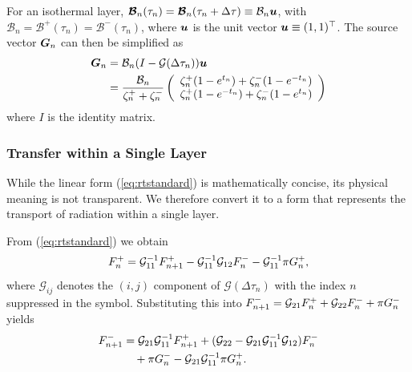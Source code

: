 For an isothermal layer, $\boldsymbol{\mathcal{B}}_n (\tau_n) = \boldsymbol{\mathcal{B}}_n (\tau_n + \Delta \tau) \equiv \mathcal{B}_n \boldsymbol{u}$, with $\mathcal{B}_n = \mathcal{B}^+ (\tau_n) = \mathcal{B}^- (\tau_n)$, where $\boldsymbol{u}$ is the unit vector $\boldsymbol{u} \equiv (1,1)^\top$. The source vector $\boldsymbol{G}_n$ can then be simplified as
\begin{align}
\boldsymbol{G}_n &= \mathcal{B}_n (I - \mathcal{G} (\Delta \tau_n) ) \boldsymbol{u} \\
&= \frac{\mathcal{B}_n}{\zeta_n^+ + \zeta_n^-} \left(
\begin{array}{c}
     \zeta_n^+ (1 - e^{t_n}) + \zeta_n^- (1 - e^{-t_n}) \\
    \zeta_n^+ (1 - e^{-t_n}) + \zeta_n^- (1 - e^{t_n})
\end{array}
\right)
\end{align}
where $I$ is the identity matrix.\\




\subsubsection*{Transfer within a Single Layer}

While the linear form (\ref{eq:rtstandard}) is mathematically concise, its physical meaning is not transparent. We therefore convert it to a form that represents the transport of radiation within a single layer.

From (\ref{eq:rtstandard}) we obtain
\begin{align}
    F^+_n = \mathcal{G}_{11}^{-1} F^+_{n+1} - \mathcal{G}_{11}^{-1} \mathcal{G}_{12} F^-_n -\mathcal{G}_{11}^{-1} \pi G_n^+,
\end{align}
where $\mathcal{G}_{ij}$ denotes the $(i,j)$ component of $\mathcal{G}(\Delta \tau_n)$ with the index $n$ suppressed in the symbol. Substituting this into
$F^-_{n+1} = \mathcal{G}_{21} F^+_{n} + \mathcal{G}_{22} F^-_n + \pi G_n^-$ yields
\begin{align}
F^-_{n+1} &= \mathcal{G}_{21} \mathcal{G}_{11}^{-1} F^+_{n+1} + (\mathcal{G}_{22} - \mathcal{G}_{21} \mathcal{G}_{11}^{-1} \mathcal{G}_{12}) F^-_n \nonumber \\
&\quad + \pi G_n^- - \mathcal{G}_{21} \mathcal{G}_{11}^{-1} \pi G_n^+ .
\end{align}

